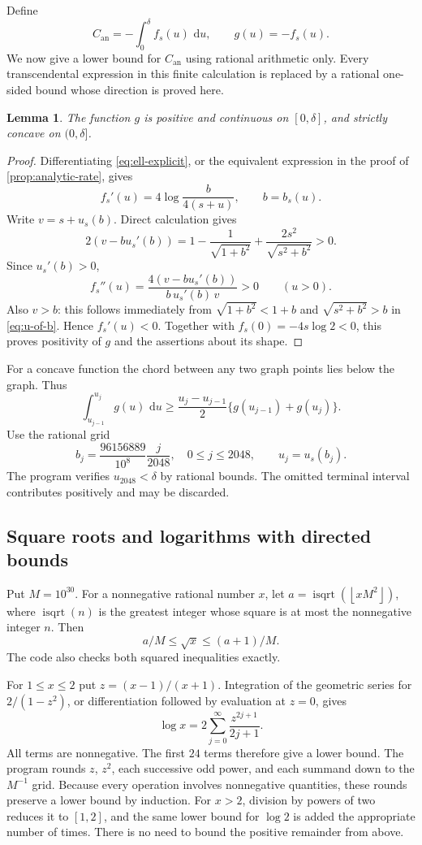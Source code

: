 \documentclass[11pt,letterpaper]{article}
\newtheorem{lemma}[lemma]{Lemma}
\theoremstyle{definition}
\newcommand{\dd}{\,\mathrm d}
\newcommand{\an}{\mathrm{an}}
\newcommand{\floor}[1]{\left\lfloor #1\right\rfloor}
\begin{document}
Define
\[
 C_{\an}=-\int_0^\delta f_s(u)\,\dd u,\qquad g(u)=-f_s(u).
\]
We now give a lower bound for $C_{\an}$ using rational arithmetic only.
Every transcendental expression in this finite calculation is replaced by
a rational one-sided bound whose direction is proved here.

\begin{lemma}\label{lem:concavity}
The function $g$ is positive and continuous on $[0,\delta]$, and strictly
concave on $(0,\delta]$.
\end{lemma}
\begin{proof}
Differentiating \eqref{eq:ell-explicit}, or the equivalent expression in
the proof of \cref{prop:analytic-rate}, gives
\[
 f_s'(u)=4\log\frac{b}{4(s+u)},\qquad b=b_s(u).
\]
Write $v=s+u_s(b)$. Direct calculation gives
\[
 2(v-bu_s'(b))
 =1-\frac1{\sqrt{1+b^2}}+\frac{2s^2}{\sqrt{s^2+b^2}}>0.
\]
Since $u_s'(b)>0$,
\[
 f_s''(u)=\frac{4(v-bu_s'(b))}{b\,u_s'(b)\,v}>0
 \qquad(u>0).
\]
Also $v>b$: this follows immediately from
$\sqrt{1+b^2}<1+b$ and $\sqrt{s^2+b^2}>b$ in \eqref{eq:u-of-b}.
Hence $f_s'(u)<0$. Together with $f_s(0)=-4s\log2<0$, this proves
positivity of $g$ and the assertions about its shape.
\end{proof}

For a concave function the chord between any two graph points lies below
the graph. Thus
\begin{equation}\label{eq:trapezoid-lower}
 \int_{u_{j-1}}^{u_j}g(u)\,\dd u
 \ge\frac{u_j-u_{j-1}}2\{g(u_{j-1})+g(u_j)\}.
\end{equation}
Use the rational grid
\begin{equation}\label{eq:b-grid}
 b_j=\frac{96156889}{10^8}\frac{j}{2048},
 \quad 0\le j\le2048,\qquad u_j=u_s(b_j).
\end{equation}
The program verifies $u_{2048}<\delta$ by rational bounds. The omitted
terminal interval contributes positively and may be discarded.

\subsection{Square roots and logarithms with directed bounds}
Put $M=10^{30}$. For a nonnegative rational number $x$, let
$a=\operatorname{isqrt}(\floor{xM^2})$, where
$\operatorname{isqrt}(n)$ is the greatest integer whose square is at most
the nonnegative integer $n$. Then
\[
 a/M\le\sqrt x\le(a+1)/M.
\]
The code also checks both squared inequalities exactly.

For $1\le x\le2$ put $z=(x-1)/(x+1)$. Integration of the geometric series
for $2/(1-z^2)$, or differentiation followed by evaluation at $z=0$, gives
\[
 \log x=2\sum_{j=0}^\infty\frac{z^{2j+1}}{2j+1}.
\]
All terms are nonnegative. The first $24$ terms therefore give a lower
bound. The program rounds $z$, $z^2$, each successive odd power, and each
summand down to the $M^{-1}$ grid. Because every operation involves
nonnegative quantities, these rounds preserve a lower bound by induction.
For $x>2$, division by powers of two reduces it to $[1,2]$, and the same
lower bound for $\log2$ is added the appropriate number of times.
There is no need to bound the positive remainder from above.
\end{document}
